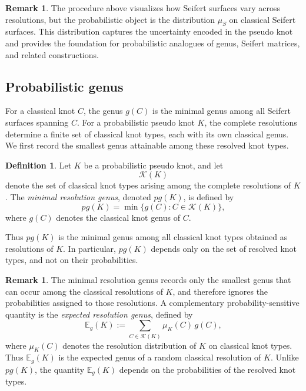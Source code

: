 \documentclass[a4paper, reqno, 12pt]{amsart}
\theoremstyle{plain}
\theoremstyle{definition}
\newtheorem{definition}[theorem]{Definition}
\newtheorem{remark}[theorem]{Remark}
\begin{document}
\begin{remark}\rm
The procedure above visualizes how Seifert surfaces vary across resolutions, but the probabilistic object is the distribution \(\mu_S\) on classical Seifert surfaces. This distribution captures the uncertainty encoded in the pseudo knot and provides the foundation for probabilistic analogues of genus, Seifert matrices, and related constructions.
\end{remark}







\subsection{Probabilistic genus}

For a classical knot \(C\), the genus \(g(C)\) is the minimal genus among all Seifert surfaces spanning \(C\). For a probabilistic pseudo knot \(K\), the complete resolutions determine a finite set of classical knot types, each with its own classical genus. We first record the smallest genus attainable among these resolved knot types.

\begin{definition}\rm
Let \(K\) be a probabilistic pseudo knot, and let
\[
\mathcal K(K)
\]
denote the set of classical knot types arising among the complete resolutions of \(K\). The \emph{minimal resolution genus}, denoted \(pg(K)\), is defined by
\[
pg(K)=\min\{g(C): C\in\mathcal K(K)\},
\]
where \(g(C)\) denotes the classical knot genus of \(C\).

Thus \(pg(K)\) is the minimal genus among all classical knot types obtained as resolutions of \(K\). In particular, \(pg(K)\) depends only on the set of resolved knot types, and not on their probabilities.
\end{definition}


\begin{remark}\rm
The minimal resolution genus records only the smallest genus that can occur among the classical resolutions of \(K\), and therefore ignores the probabilities assigned to those
resolutions. A complementary probability-sensitive quantity is the \emph{expected resolution genus}, defined by
\[
\mathbb E_g(K)
:=
\sum_{C\in \mathcal K(K)}
\mu_K(C)\,g(C),
\]
where \(\mu_K(C)\) denotes the resolution distribution of \(K\) on classical knot types.
Thus \(\mathbb E_g(K)\) is the expected genus of a random classical resolution of \(K\).
Unlike \(pg(K)\), the quantity \(\mathbb E_g(K)\) depends on the probabilities of the
resolved knot types.
\end{remark}
\end{document}

